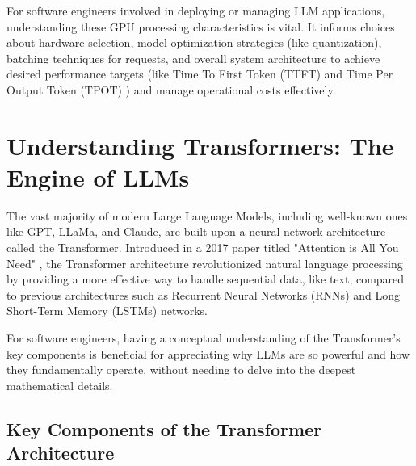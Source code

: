 For software engineers involved in deploying or managing LLM applications, understanding these GPU processing characteristics is vital. 
It informs choices about hardware selection, model optimization strategies (like quantization), batching techniques for requests, and 
overall system architecture to achieve desired performance targets (like Time To First Token (TTFT) and Time Per Output Token (TPOT) ) 
and manage operational costs effectively.

\section{Understanding Transformers: The Engine of LLMs}

The vast majority of modern Large Language Models, including well-known ones like GPT, LLaMa, and Claude, are built upon a neural network 
architecture called the Transformer. Introduced in a 2017 paper titled "Attention is All You Need" , the Transformer architecture revolutionized
 natural language processing by providing a more effective way to handle sequential data, like text, compared to previous architectures such as 
 Recurrent Neural Networks (RNNs) and Long Short-Term Memory (LSTMs) networks.

For software engineers, having a conceptual understanding of the Transformer's key components is beneficial for appreciating why LLMs are so 
powerful and how they fundamentally operate, without needing to delve into the deepest mathematical details.

\subsection*{Key Components of the Transformer Architecture}

